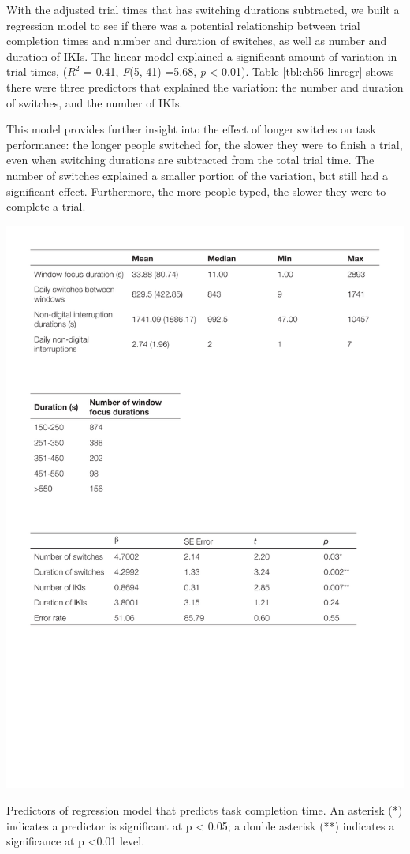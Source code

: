 With the adjusted trial times that has switching durations subtracted, we built a regression model to see if there was a potential relationship between trial completion times and number and duration of switches, as well as number and duration of IKIs. The linear model explained a significant amount of variation in trial times, ($R^2$ = 0.41, \textit{F}(5, 41) =5.68, \textit{p} < 0.01). Table \ref{tbl:ch56-linregr} shows there were three predictors that explained the variation: the number and duration of switches, and the number of IKIs. 

This model provides further insight into the effect of longer switches on task performance: the longer people switched for, the slower they were to finish a trial, even when switching durations are subtracted from the total trial time. The number of switches explained a smaller portion of the variation, but still had a significant effect. Furthermore, the more people typed, the slower they were to complete a trial.

\begin{table}
\centering
\centerline{\includegraphics[scale=0.8]{images/ch56/ch56-linregr.pdf}}
\caption{Predictors of regression model that predicts task completion time. An asterisk (*) indicates a predictor is significant at p < 0.05; a double asterisk (**) indicates a significance at p <0.01 level.}
\label{tbl:ch56-linregr}
\end{table}

